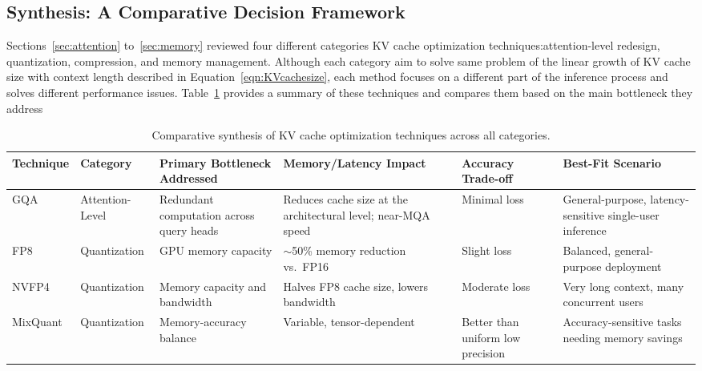 \documentclass[conference]{IEEEtran}
\begin{document}
\subsection{Synthesis: A Comparative Decision Framework}
\label{sec:synthesis}
Sections~\ref{sec:attention} to~\ref{sec:memory} reviewed four different categories KV cache optimization techniques:attention-level redesign, quantization, compression, and memory management. Although each category aim to solve same problem of the linear growth of KV cache size with context length described in Equation~\eqref{eqn:KVcachesize}, each method focuses on a different part of the inference process and solves different performance issues. Table~\ref{tab:synthesis} provides a summary of these techniques and compares them based on the main bottleneck they address

\begin{table}[htbp]
	\centering
	\caption{Comparative synthesis of KV cache optimization techniques across all categories.}
	\label{tab:synthesis}
	\small
	\begin{tabularx}{\linewidth}{llXXXX}
		\toprule
		\textbf{Technique} & \textbf{Category}         & \textbf{Primary Bottleneck Addressed}    & \textbf{Memory/Latency Impact}                                & \textbf{Accuracy Trade-off}       & \textbf{Best-Fit Scenario}                               \\
		\midrule
		GQA                & Attention-Level           & Redundant computation across query heads & Reduces cache size at the architectural level; near-MQA speed & Minimal loss                      & General-purpose, latency-sensitive single-user inference \\
		\midrule
		FP8                & Quantization              & GPU memory capacity                      & $\sim$50\% memory reduction vs.\ FP16                         & Slight loss                       & Balanced, general-purpose deployment                     \\
		NVFP4              & Quantization              & Memory capacity and bandwidth            & Halves FP8 cache size, lowers bandwidth                       & Moderate loss                     & Very long context, many concurrent users                 \\
		MixQuant           & Quantization              & Memory-accuracy balance                  & Variable, tensor-dependent                                    & Better than uniform low precision & Accuracy-sensitive tasks needing memory savings          \\

\end{tabularx}
\end{table}
\end{document}
